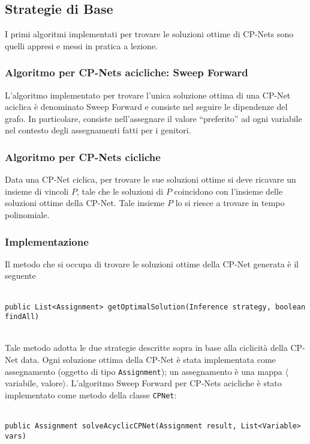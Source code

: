 \subsection{Strategie di Base}
I primi algoritmi implementati per trovare le soluzioni ottime di CP-Nets sono quelli appresi e messi in pratica a lezione.

\subsubsection{Algoritmo per CP-Nets acicliche: Sweep Forward}
L'algoritmo implementato per trovare l'unica soluzione ottima di una CP-Net aciclica è denominato Sweep Forward e consiste nel seguire le dipendenze del grafo. In particolare, consiste nell'assegnare il valore ``preferito'' ad ogni variabile nel contesto degli assegnamenti fatti per i genitori.

\subsubsection{Algoritmo per CP-Nets cicliche}
Data una CP-Net ciclica, per trovare le sue soluzioni ottime si deve ricavare un insieme di vincoli $P$, tale che le soluzioni di $P$ coincidono con l'insieme delle soluzioni ottime della CP-Net. Tale insieme $P$ lo si riesce a  trovare in tempo polinomiale.

\subsubsection{Implementazione}
Il metodo che si occupa di trovare le soluzioni ottime della CP-Net generata è il seguente
\\
\\
\centerline{\texttt{public List<Assignment> getOptimalSolution(Inference strategy, boolean findAll)}}
\\

Tale metodo adotta le due strategie descritte sopra in base alla ciclicità della CP-Net data.
Ogni soluzione ottima della CP-Net è stata implementata come assegnamento (oggetto di tipo \texttt{Assignment}); un assegnamento è una mappa $\langle$variabile, valore$\rangle$.
L'algoritmo Sweep Forward per CP-Nets acicliche è stato implementato come metodo della classe \texttt{CPNet}:\\
\\
\centerline{\texttt{public Assignment solveAcyclicCPNet(Assignment result, List<Variable> vars)}}
\\

